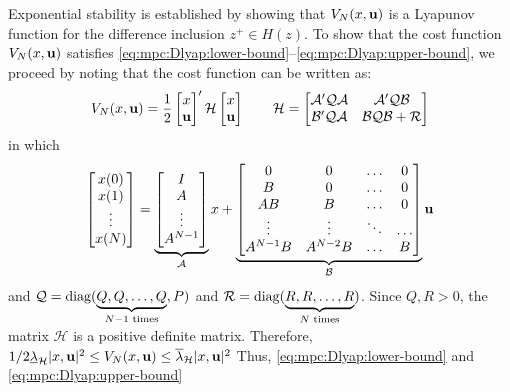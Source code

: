Exponential stability is established by showing that $V_N(x,\mathbf{u})$ is a
Lyapunov function for the difference inclusion $z^+ \in H(z)$. 
To show that the cost function $V_N(x,\mathbf{u})$ satisfies
\eqref{eq:mpc:Dlyap:lower-bound}--\eqref{eq:mpc:Dlyap:upper-bound}, we
proceed by noting that the cost function can be written as:
\begin{equation}
V_N(x,\mathbf{u}) = \frac{1}{2} \begin{bmatrix} x\\\mathbf{u} \end{bmatrix}'
\mathcal{H} \begin{bmatrix} x\\\mathbf{u} \end{bmatrix}  
\qquad 
\mathcal{H} = \begin{bmatrix} \mathcal{A}'\mathcal{Q}\mathcal{A}
  &\mathcal{A}'\mathcal{Q}\mathcal{B}\\
  \mathcal{B}'\mathcal{Q}\mathcal{A} &
  \mathcal{B}\mathcal{Q}\mathcal{B} + \mathcal{R} \end{bmatrix} 
\label{eq:mpc:VN_H}
\end{equation}
in which 
\begin{equation*}
\begin{bmatrix}x(0)\\x(1)\\\vdots\\x(N)\end{bmatrix} =
\underbrace{\begin{bmatrix}I\\A\\\vdots\\A^{N-1}\end{bmatrix}}_{\mathcal{A}}x
+\underbrace{\begin{bmatrix}0&0&\ldots&0\\
B&0&\ldots&0\\AB&B&\ldots&0\\
\vdots&\vdots&\ddots&\ldots\\
A^{N-1}B&A^{N-2}B&\ldots&B\end{bmatrix}}_{\mathcal{B}}\mathbf{u}  
\end{equation*}
and $\mathcal{Q} = \text{diag}(\underbrace{Q,Q,\ldots,Q}_{N-1 
  \text{~times}},P)$ and $\mathcal{R} =
\text{diag}(\underbrace{R,R,\ldots,R}_{N \text{~times}})$. 
Since $Q,R>0$, the matrix $\mathcal{H}$ is a positive definite
matrix. Therefore, $1/2\underline{\lambda}_{\mathcal{H}}\vert x,\mathbf{u} \vert^2
\leq V_N(x,\mathbf{u}) \leq \overline{\lambda}_{\mathcal{H}}\vert x,\mathbf{u} \vert^2$
Thus,
\eqref{eq:mpc:Dlyap:lower-bound} and \eqref{eq:mpc:Dlyap:upper-bound}
